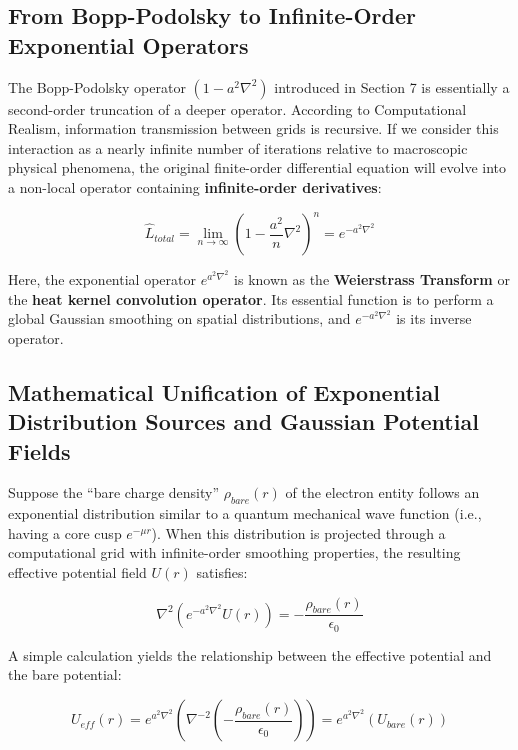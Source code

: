 \documentclass[12pt, a4paper]{article}
\begin{document}
\subsection{From Bopp-Podolsky to Infinite-Order Exponential Operators}

The Bopp-Podolsky operator $(1 - a^2\nabla^2)$ introduced in Section 7 is essentially a second-order truncation of a deeper operator. According to Computational Realism, information transmission between grids is recursive. If we consider this interaction as a nearly infinite number of iterations relative to macroscopic physical phenomena, the original finite-order differential equation will evolve into a non-local operator containing \textbf{infinite-order derivatives}:

\begin{equation}
\hat{L}_{total} = \lim_{n \to \infty} \left(1 - \frac{a^2}{n}\nabla^2\right)^n = e^{-a^2\nabla^2}
\end{equation}

Here, the exponential operator $e^{a^2\nabla^2}$ is known as the \textbf{Weierstrass Transform} or the \textbf{heat kernel convolution operator}. Its essential function is to perform a global Gaussian smoothing on spatial distributions, and $e^{-a^2\nabla^2}$ is its inverse operator.

\subsection{Mathematical Unification of Exponential Distribution Sources and Gaussian Potential Fields}

Suppose the ``bare charge density'' $\rho_{bare}(r)$ of the electron entity follows an exponential distribution similar to a quantum mechanical wave function (i.e., having a core cusp $e^{-\mu r}$). When this distribution is projected through a computational grid with infinite-order smoothing properties, the resulting effective potential field $U(r)$ satisfies:

\begin{equation}
\nabla^2 \left( e^{-a^2\nabla^2} U(r) \right) = -\frac{\rho_{bare}(r)}{\epsilon_0}
\end{equation}

A simple calculation yields the relationship between the effective potential and the bare potential:

\begin{equation}
U_{eff}(r) =  e^{a^2\nabla^2} \left( \nabla^{-2} \left( -\frac{\rho_{bare}(r)}{\epsilon_0} \right) \right) =  e^{a^2\nabla^2} \left( U_{bare}(r) \right) 
\end{equation}
\end{document}
